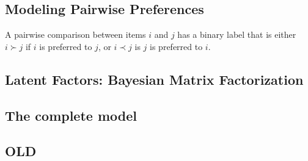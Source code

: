 
\subsection{Modeling Pairwise Preferences}


A pairwise comparison between items $i$ and $j$ has a binary label that is either $i \succ j$
if $i$ is preferred to $j$, or $i \prec j$ is $j$ is preferred to $i$.

\subsection{Latent Factors: Bayesian Matrix Factorization}


\subsection{The complete model}


\subsection{OLD}


